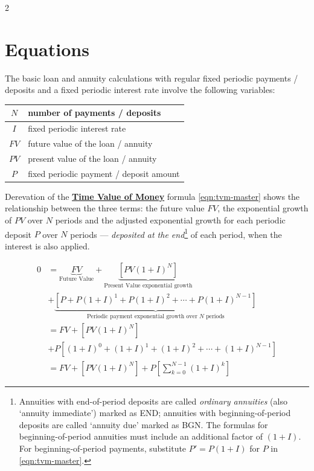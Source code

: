 \documentclass[11pt]{article}%
\begin{document}
\begin{multicols*}{2}
\section{Equations}\label{sec:equations}
The basic loan and annuity calculations with regular fixed periodic payments / deposits and a fixed periodic interest rate involve the following variables:

\begin{center}
\setlength{\extrarowheight}{1.5pt}
\begin{tabularx}{0.95\columnwidth}{|c|X|} \hline
$N$ & number of payments / deposits  \\ \hline
$I$ & fixed periodic interest rate \\ \hline
$FV$ & future value of the loan / annuity \\ \hline
$PV$ & present value of the loan / annuity \\ \hline
$P$ & fixed periodic payment / deposit amount \\ \hline
\end{tabularx}
\end{center}

Derevation of the \textbf{\href{https://en.wikipedia.org/wiki/Time_value_of_money}{Time Value of Money}} formula \eqref{eqn:tvm-master} shows the relationship between the three terms: the future value $FV$, the exponential growth of $PV$ over $N$ periods and the adjusted exponential growth for each periodic deposit $P$ over $N$ periods --- \textit{deposited at the end}\footnote{Annuities with end-of-period deposits are called \textit{ordinary annuities} (also `annuity immediate') marked as END; annuities with beginning-of-period deposits are called `annuity due' marked as BGN. The formulas for beginning-of-period annuities must include an additional factor of $\left(1 + I\right)$. For beginning-of-period payments, substitute $P' = P \left(1 + I\right)$ for $P$ in \eqref{eqn:tvm-master}.} of each period, when the interest is also applied. 

\begin{align}
0 &= \underbrace{FV}_{\text{Future Value}} + \underbrace{\left[ PV \left( 1 + I \right)^{N} \right] \label{eqn:tvm-master}}_{\text{Present Value exponential growth}} \\
 &+ \underbrace{\left[ P + P \left( 1 + I \right)^{1} + P \left( 1 + I \right)^{2} + \cdots + P \left( 1 + I \right)^{N - 1} \right]}_{\text{Periodic payment exponential growth over $N$ periods}} \nonumber \\
 &= FV + \left[ PV \left( 1 + I \right)^{N} \right] \\
 &+ P \left[ \left( 1 + I \right)^{0} + \left( 1 + I \right)^{1} + \left( 1 + I \right)^{2} + \cdots + \left( 1 + I \right)^{N - 1} \right] \nonumber \\
 &= FV + \left[ PV \left( 1 + I \right)^{N} \right] + P \left[ \sum_{k=0}^{N - 1} \left( 1 + I \right)^{k} \right] \label{eqn:tvm-sum}
\end{align}


\end{multicols*}
\end{document}
